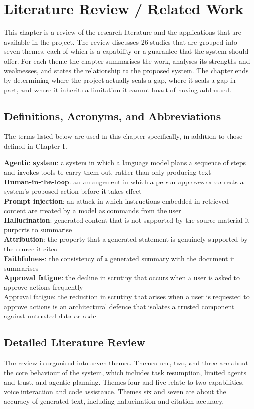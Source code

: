 \documentclass{FastFyp}
\begin{document}
\chapter{Literature Review / Related Work}
This chapter is a review of the research literature and the applications that are available in the project. The review discusses 26 studies that are grouped into seven themes, each of which is a capability or a guarantee that the system should offer. For each theme the chapter summarises the work, analyses its strengths and weaknesses, and states the relationship to the proposed system. The chapter ends by determining where the project actually seals a gap, where it seals a gap in part, and where it inherits a limitation it cannot boast of having addressed.

\section{Definitions, Acronyms, and Abbreviations}
The terms listed below are used in this chapter specifically, in addition to those defined in Chapter 1.

\textbf{Agentic system}: a system in which a language model plans a sequence of steps and invokes tools to carry them out, rather than only producing text\\
\textbf{Human-in-the-loop}: an arrangement in which a person approves or corrects a system's proposed action before it takes effect\\
\textbf{Prompt injection}: an attack in which instructions embedded in retrieved content are treated by a model as commands from the user\\
\textbf{Hallucination}: generated content that is not supported by the source material it purports to summarise\\
\textbf{Attribution}: the property that a generated statement is genuinely supported by the source it cites\\
\textbf{Faithfulness}: the consistency of a generated summary with the document it summarises\\
\textbf{Approval fatigue}: the decline in scrutiny that occurs when a user is asked to approve actions frequently\\
Approval fatigue: the reduction in scrutiny that arises when a user is requested to approve actions is an architectural defence that isolates a trusted component against untrusted data or code.

\section{Detailed Literature Review}
The review is organised into seven themes. Themes one, two, and three are about the core behaviour of the system, which includes task resumption, limited agents and trust, and agentic planning. Themes four and five relate to two capabilities, voice interaction and code assistance. Themes six and seven are about the accuracy of generated text, including hallucination and citation accuracy.
\end{document}
